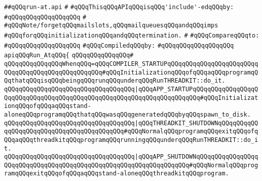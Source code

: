 \label{src/lib/src/lib/thread-kit/src/core-thread-kit/run-at.api}
\verb|##qQQqrun-at.api|\newline
\verb|#|\newline
\verb|#qQQqThisqQQqAPIqQQqisqQQq'include'-edqQQqby:|\newline
\verb|#qQQqqQQqqQQqqQQqqQQq|\newline
\verb|#|\newline
\verb|#qQQqNote/forgetqQQqmailslots,qQQqmailqueuesqQQqandqQQqimps|\newline
\verb|#qQQqforqQQqinitializationqQQqandqQQqtermination.|\newline
\verb|#|\newline
\verb|#qQQqCompareqQQqto:|\newline
\verb|#qQQqqQQqqQQqqQQqqQQq|\newline
\newline
\verb|#qQQqCompiledqQQqby:|\newline
\verb|#qQQqqQQqqQQqqQQqqQQq|\newline
\newline
\newline
\verb|apiqQQqRun_AtqQQq{|\newline
\verb|qQQqqQQqqQQqqQQq#|\newline
\verb|qQQqqQQqqQQqqQQqWhenqQQq=qQQqCOMPILER_STARTUPqQQqqQQqqQQqqQQqqQQqqQQqqQQqqQQqqQQqqQQqqQQqqQQqqQQq#qQQqInitializationqQQqofqQQqaqQQqprogramqQQqthatqQQqisqQQqbeingqQQqrunqQQqunderqQQqRunTHREADKIT::do_it.|\newline
\verb|qQQqqQQqqQQqqQQqqQQqqQQqqQQqqQQqqQQq|\verb#|qQQqAPP_STARTUPqQQqqQQqqQQqqQQqqQQqqQQqqQQqqQQqqQQqqQQqqQQqqQQqqQQqqQQqqQQqqQQqqQQqqQQq#\verb|#qQQqInitializationqQQqofqQQqaqQQqstand-aloneqQQqprogramqQQqthatqQQqwasqQQqgeneratedqQQqbyqQQqspawn_to_disk.|\newline
\verb|qQQqqQQqqQQqqQQqqQQqqQQqqQQqqQQqqQQq|\verb#|qQQqTHREADKIT_SHUTDOWNqQQqqQQqqQQqqQQqqQQqqQQqqQQqqQQqqQQqqQQqqQQq#\verb|#qQQqNormalqQQqprogramqQQqexitqQQqofqQQqaqQQqthreadkitqQQqprogramqQQqrunningqQQqunderqQQqRunTHREADKIT::do_it.|\newline
\verb|qQQqqQQqqQQqqQQqqQQqqQQqqQQqqQQqqQQq|\verb#|qQQqAPP_SHUTDOWNqQQqqQQqqQQqqQQqqQQqqQQqqQQqqQQqqQQqqQQqqQQqqQQqqQQqqQQqqQQqqQQqqQQq#\verb|#qQQqNormalqQQqprogramqQQqexitqQQqofqQQqaqQQqstand-aloneqQQqthreadkitqQQqprogram.|\newline
